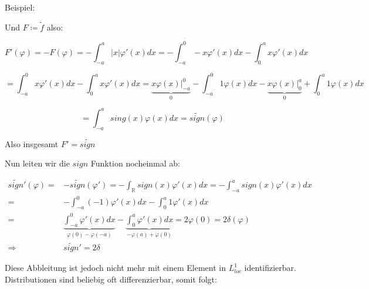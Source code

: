 \documentclass[ngerman]{article}
\theoremstyle{plain}
\theoremstyle{definition}
\numberwithin{equation}{section}
\newcommand{\abs}[1] {
\left| #1 \right|
}
\newcommand{\R}[0] {
\mathbb R
}
\begin{document}
Beispiel:

\begin{center}
\end{center}
Und $F \coloneqq \tilde f$ also:

\[F'(\varphi) = -F(\varphi) = - \int_{-a}^a \abs{x} \varphi'(x) dx = - \int_{-a}^0 -x \varphi'(x) dx - \int_0^a x \varphi'(x) dx \]

\[= \int_{-a}^0 x \varphi'(x) dx - \int_0^a x \varphi'(x) dx = \underbrace{x \varphi(x)|_{-a}^0}_{0} - \int_{-a}^0 1 \varphi(x) dx - \underbrace{x \varphi(x)|_0^a}_{0} + \int_0^a 1 \varphi(x) dx\]

\[= \int_{-a}^a sing(x) \varphi(x) dx = \tilde{sign}(\varphi)\]

\begin{center}
\end{center}

Also insgesamt $F'=\tilde{sign}$

Nun leiten wir die $sign$ Funktion nocheinmal ab:

\begin{align*}
    \tilde{sign}'(\varphi) =& -\tilde{sign}(\varphi') = - \int_\R sign(x) \varphi'(x) dx = - \int_{-a}^a sign(x) \varphi'(x) dx\\
    =&- \int_{-a}^0 (-1) \varphi'(x) dx - \int_0^a 1 \varphi'(x)dx\\
    =&\underbrace{\int_{-a}^0 \varphi'(x) dx}_{\varphi(0) - \varphi(-a)} - \underbrace{\int_0^a \varphi'(x)dx}_{-\varphi(a)+\varphi(0)} = 2 \varphi(0) = 2 \delta(\varphi)\\
    \Rightarrow & \tilde{sign}'=2\delta
\end{align*}

Diese Abbleitung ist jedoch nicht mehr mit einem Element in $L^1_{loc}$ identifizierbar.
Distributionen sind beliebig oft differenzierbar, somit folgt:
\end{document}
